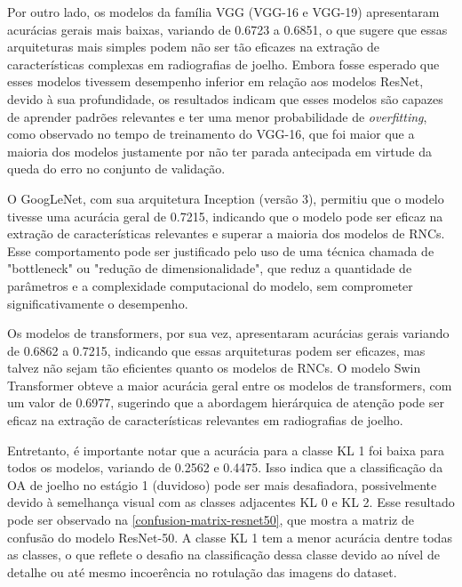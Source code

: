 Por outro lado, os modelos da família VGG (VGG-16 e VGG-19) apresentaram acurácias gerais mais baixas, variando de 0.6723 a 0.6851, o que sugere que essas arquiteturas mais simples podem não ser tão eficazes na extração de características complexas em radiografias de joelho. Embora fosse esperado que esses modelos tivessem desempenho inferior em relação aos modelos ResNet, devido à sua profundidade, os resultados indicam que esses modelos são capazes de aprender padrões relevantes e ter uma menor probabilidade de \textit{overfitting}, como observado no tempo de treinamento do VGG-16, que foi maior que a maioria dos modelos justamente por não ter parada antecipada em virtude da queda do erro no conjunto de validação.

O GoogLeNet, com sua arquitetura Inception (versão 3), permitiu que o modelo tivesse uma acurácia geral de 0.7215, indicando que o modelo pode ser eficaz na extração de características relevantes e superar a maioria dos modelos de RNCs. Esse comportamento pode ser justificado pelo uso de uma técnica chamada de "bottleneck" ou "redução de dimensionalidade", que reduz a quantidade de parâmetros e a complexidade computacional do modelo, sem comprometer significativamente o desempenho.

Os modelos de transformers, por sua vez, apresentaram acurácias gerais variando de 0.6862 a 0.7215, indicando que essas arquiteturas podem ser eficazes, mas talvez não sejam tão eficientes quanto os modelos de RNCs. O modelo Swin Transformer obteve a maior acurácia geral entre os modelos de transformers, com um valor de 0.6977, sugerindo que a abordagem hierárquica de atenção pode ser eficaz na extração de características relevantes em radiografias de joelho.

Entretanto, é importante notar que a acurácia para a classe KL 1 foi baixa para todos os modelos, variando de 0.2562 e 0.4475. Isso indica que a classificação da OA de joelho no estágio 1 (duvidoso) pode ser mais desafiadora, possivelmente devido à semelhança visual com as classes adjacentes KL 0 e KL 2. Esse resultado pode ser observado na \autoref{confusion-matrix-resnet50}, que mostra a matriz de confusão do modelo ResNet-50. A classe KL 1 tem a menor acurácia dentre todas as classes, o que reflete o desafio na classificação dessa classe devido ao nível de detalhe ou até mesmo incoerência no rotulação das imagens do dataset.

